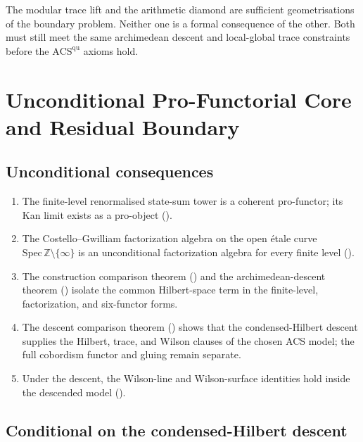 \begin{remark}
\label{v4-arith:w10-a:rem:partial-order}
The modular trace lift and the arithmetic diamond are sufficient
geometrisations of the boundary problem. Neither one is a formal
consequence of the other. Both must still meet the same archimedean
descent and local-global trace constraints before the
\(\mathrm{ACS}^{\mathrm{qu}}\) axioms hold.
\end{remark}

\section{Unconditional Pro-Functorial Core and Residual Boundary}
\label{v4-arith:w10-a:what-closes}

\subsection*{Unconditional consequences}

\begin{enumerate}
\item The finite-level renormalised state-sum tower is a coherent
pro-functor; its Kan limit exists as a pro-object
().
\item The Costello--Gwilliam factorization algebra on the open
\'etale curve \(\mathrm{Spec}\,\mathbb{Z}\setminus\{\infty\}\) is an
unconditional factorization algebra for every finite level
().
\item The construction comparison theorem
() and the
archimedean-descent theorem
() isolate the common
Hilbert-space term in the finite-level, factorization, and six-functor
forms.
\item The descent comparison theorem
() shows that the
condensed-Hilbert descent supplies the Hilbert, trace, and Wilson
clauses of the chosen ACS model; the full cobordism functor and gluing
remain separate.
\item Under the descent, the Wilson-line and Wilson-surface
identities hold inside the descended model
().
\end{enumerate}

\subsection*{Conditional on the condensed-Hilbert descent}

